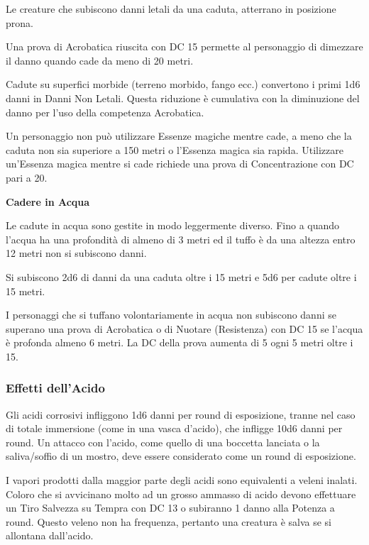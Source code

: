 \documentclass[a4paper,11pt,twoside,openany]{book}
\begin{document}
Le creature che subiscono danni letali da una caduta, atterrano in posizione prona.

Una prova di Acrobatica riuscita con DC 15 permette al personaggio di dimezzare il danno quando cade da meno di 20 metri.

Cadute su superfici morbide (terreno morbido, fango ecc.) convertono i primi 1d6 danni in Danni Non Letali. Questa riduzione è cumulativa con la diminuzione del danno per l'uso della competenza Acrobatica.

Un personaggio non può utilizzare Essenze magiche mentre cade, a meno che la caduta non sia superiore a 150 metri o l'Essenza magica sia rapida. Utilizzare un'Essenza magica mentre si cade richiede una prova di Concentrazione con DC pari a 20.

\textbf{Cadere in Acqua}

Le cadute in acqua sono gestite in modo leggermente diverso. Fino a quando l'acqua ha una profondità di almeno di 3 metri ed il tuffo è da una altezza entro 12 metri non si subiscono danni.

Si subiscono 2d6 di danni da una caduta oltre i 15 metri e 5d6 per cadute oltre i 15 metri.

I personaggi che si tuffano volontariamente in acqua non subiscono danni se superano una prova di Acrobatica o di Nuotare (Resistenza) con DC 15 se l'acqua è profonda almeno 6 metri. La DC della prova aumenta di 5 ogni 5 metri oltre i 15.

\subsubsection{Effetti dell'Acido}

\label{effetti-dellacido}

Gli acidi corrosivi infliggono 1d6 danni per round di esposizione, tranne nel caso di totale immersione (come in una vasca d'acido), che infligge 10d6 danni per round. Un attacco con l'acido, come quello di una boccetta lanciata o la saliva/soffio di un mostro, deve essere considerato come un round di esposizione.

I vapori prodotti dalla maggior parte degli acidi sono equivalenti a veleni inalati. Coloro che si avvicinano molto ad un grosso ammasso di acido devono effettuare un Tiro Salvezza su Tempra con DC 13 o subiranno 1 danno alla Potenza a round. Questo veleno non ha frequenza, pertanto una creatura è salva se si allontana dall'acido.
\end{document}
